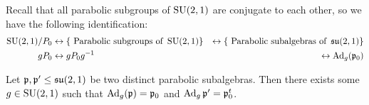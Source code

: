 \documentclass{report}
\begin{document}
Recall that all parabolic subgroups of $\operatorname{{\mathrm{SU}}}(2,1)$ are conjugate to each other, so we have the following identification:
\begin{align*}
    \operatorname{{\mathrm{SU}}}(2,1)/{P_0} &\leftrightarrow \{ \text{ Parabolic subgroups of } \operatorname{{\mathrm{SU}}}(2,1) \} &\leftrightarrow \{ \text{ Parabolic subalgebras of } \operatorname{{\mathfrak{su}}}(2,1) \} \\
    g P_0 &\leftrightarrow g P_0 g^{-1} &\leftrightarrow \operatorname{Ad}_g(\mathfrak p_0)    
\end{align*}

\begin{lemma}\label{lem:adjoint_parabolic}
    Let $\mathfrak p, \mathfrak p' \leq \operatorname{{\mathfrak{su}}}(2,1)$ be two distinct parabolic subalgebras.
    Then there exists some $g \in \operatorname{{\mathrm{SU}}}(2,1)$ such that $\operatorname{Ad}_g(\mathfrak p) = \mathfrak p_0$ and $\operatorname{Ad}_g \mathfrak p' = \mathfrak p_0^t$.
\end{lemma}
\end{document}
